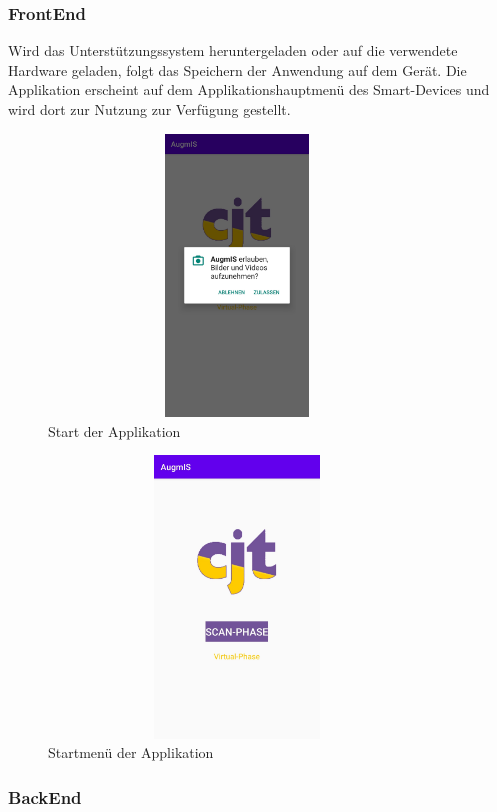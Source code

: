 \subsubsection{FrontEnd}
Wird das Unterstützungssystem heruntergeladen oder auf die verwendete Hardware geladen, folgt das Speichern der Anwendung auf dem Gerät. Die Applikation erscheint 
auf dem Applikationshauptmenü des Smart-Devices und wird dort zur Nutzung zur Verfügung gestellt. 
\begin{figure}[hbt!]
    \centering
    \includegraphics[width=10cm,height=7.5cm,keepaspectratio]{4Umsetzung/Bilder/camera_permission.jpg}
    \caption{Start der Applikation}
    \label{pic:camera_perm}
\end{figure}
\begin{figure}[hbt!]
    \centering
    \includegraphics[width=10cm,height=7.5cm,keepaspectratio]{4Umsetzung/Bilder/startmenu.jpg}
    \caption{Startmenü der Applikation}
    \label{pic:startmenu}
\end{figure}
\subsubsection{BackEnd}

